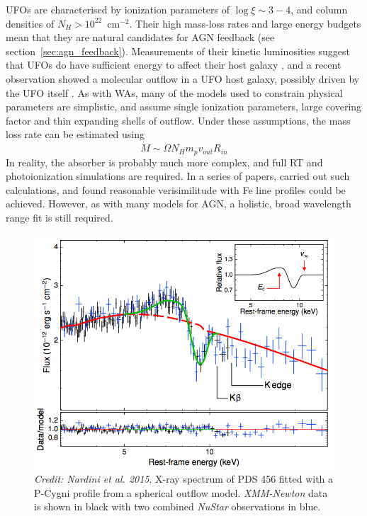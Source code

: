 UFOs are characterised by ionization parameters of $\log \xi \sim 3-4$,
and column densities of $N_H > 10^{22}$~cm$^{-2}$. Their high mass-loss rates
and large energy budgets mean that they are natural candidates for
AGN feedback (see section~\ref{sec:agn_feedback}). Measurements of
their kinetic luminosities suggest that UFOs do have sufficient 
energy to affect their host galaxy \citep{gofford2015}, and a recent observation
showed a molecular outflow in a UFO host galaxy, possibly driven 
by the UFO itself \citep{tombesi2015}. As with WAs, many of the models
used to constrain physical parameters are simplistic, and assume 
single ionization parameters, large covering factor
and thin expanding shells of outflow.
Under these assumptions, the mass loss rate can be estimated using
\begin{equation}
\label{eq:hse}
\dot{M} \sim \Omega N_H m_p v_{out} R_{in}
\end{equation}
In reality, the absorber is probably much more complex, and full 
RT and photoionization simulations are required. In a series of papers, 
\cite{simlong2008,sim2010,sim2010_hydro} carried out such calculations,
and found reasonable verisimilitude with Fe line profiles could be achieved.
However, as with many models for AGN, a holistic, broad wavelength range
fit is still required.

\begin{figure}
\centering
\includegraphics[width=1.0\textwidth]{figures/02-outflows/nardini_pds456.png}
\caption
{
{\sl Credit: Nardini et al. 2015}. 
X-ray spectrum of PDS 456 fitted with a P-Cygni profile from a 
spherical outflow model. {\sl XMM-Newton} data is shown in black 
with two combined {\sl NuStar} observations in blue.
} 
\label{fig:nardini}
\end{figure}


